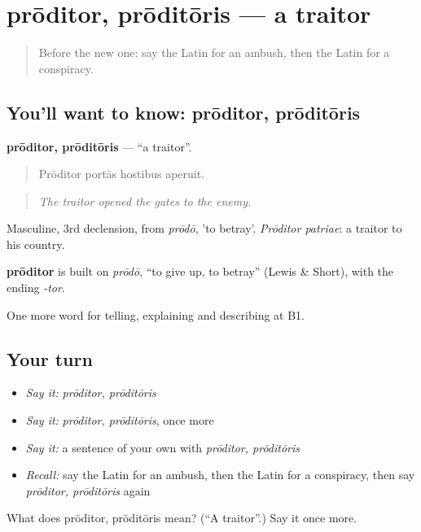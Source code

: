 \section[prōditor, prōditōris]{prōditor, prōditōris — a traitor}

\label{lesson:LA-C307-proditor}



\begin{quote}
Before the new one: say the Latin for an ambush, then the Latin for a conspiracy.
\end{quote}

\subsection*{You'll want to know: prōditor, prōditōris}
\textbf{prōditor, prōditōris} — \textquotedblleft{}a traitor\textquotedblright{}.

\begin{quote}
Prōditor portās hostibus aperuit.
\end{quote}

\begin{quote}
\emph{The traitor opened the gates to the enemy.}
\end{quote}

Masculine, 3rd declension, from \emph{prōdō}, 'to betray'. \emph{Prōditor patriae}: a traitor to his country.

\begin{cousinweb}
\textbf{prōditor} is built on \emph{prōdō}, \textquotedblleft{}to give up, to betray\textquotedblright{} (Lewis \& Short), with the ending \emph{-tor}.
\end{cousinweb}

\begin{grammarlens}[title={What you've built}]
One more word for telling, explaining and describing at B1.
\end{grammarlens}

\subsection*{Your turn}
\begin{itemize}
\raggedright
  \item \emph{Say it:} \emph{prōditor, prōditōris}
  \item \emph{Say it:} \emph{prōditor, prōditōris}, once more
  \item \emph{Say it:} a sentence of your own with \emph{prōditor, prōditōris}
  \item \emph{Recall:} say the Latin for an ambush, then the Latin for a conspiracy, then say \emph{prōditor, prōditōris} again
\end{itemize}

\begin{tcolorbox}[breakable,colback=teal!4,colframe=teal!35!black,title={Before you move on}]
What does prōditor, prōditōris mean? (\textquotedblleft{}A traitor\textquotedblright{}.) Say it once more.
\end{tcolorbox}
